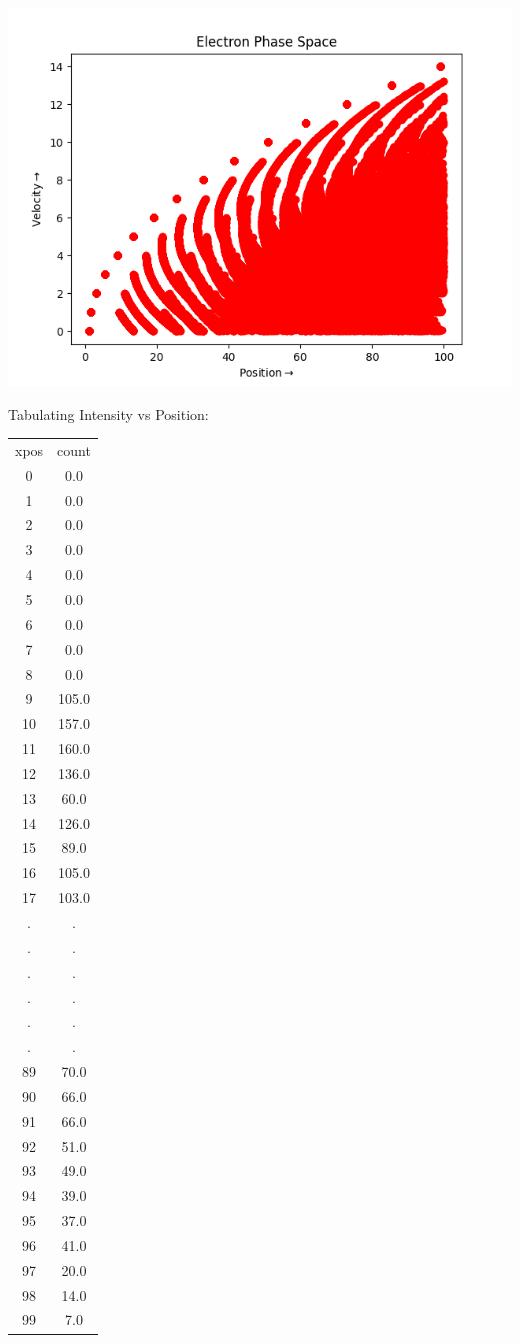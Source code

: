 \documentclass[12pt, a4paper]{report}
\begin{document}
\begin{center}
	\includegraphics[scale=0.90]{Figure_2} 
	\label{fig:rawdata}
\end{center}
\clearpage
Tabulating Intensity vs Position:
\begin{center}
\begin{tabular}{ |c|c| } 
 \hline
xpos & count \\ 
0 & 0.0\\
1 & 0.0\\
2 & 0.0\\
3 & 0.0\\
4 & 0.0\\
5 & 0.0\\
6 & 0.0\\
7 & 0.0\\
8 & 0.0\\
9 & 105.0\\
10 & 157.0\\
11 & 160.0\\
12 & 136.0\\
13 & 60.0\\
14 & 126.0\\
15 & 89.0\\
16 & 105.0\\
17 & 103.0\\
. & . \\
. & . \\
. & . \\
. & . \\
. & . \\
. & . \\
89 & 70.0\\
90 & 66.0\\
91 & 66.0\\
92 & 51.0\\
93 & 49.0\\
94 & 39.0\\
95 & 37.0\\
96 & 41.0\\
97 & 20.0\\
98 & 14.0\\
99 & 7.0\\
 \hline
\end{tabular}
\end{center}
\end{document}
